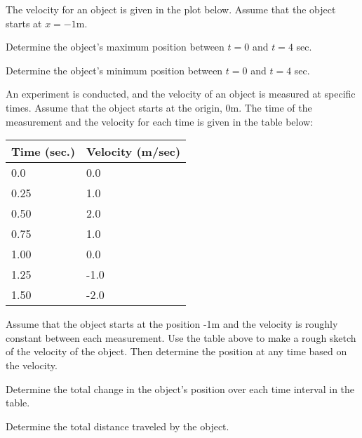 
\begin{problem}
\item The velocity for an object is given in the plot below. Assume
  that the object starts at $x=-1$m.

    \scalebox{0.7}{}

    \begin{subproblem}
    \item Determine the object's maximum position between $t=0$ and
      $t=4$ sec.
      \vfill
    \item Determine the object's minimum position between $t=0$ and
      $t=4$ sec.
      \vfill
    \end{subproblem}

\clearpage

\item An experiment is conducted, and the velocity of an object is
  measured at specific times. Assume that the object starts at the
  origin, 0m. The time of the measurement and the
  velocity for each time is given in the table below: \\
  \begin{tabular}{l|l}
    Time (sec.) & Velocity (m/sec) \\ \hline
    0.0  & 0.0 \\
    0.25 & 1.0 \\
    0.50 & 2.0 \\
    0.75 & 1.0 \\
    1.00 & 0.0 \\
    1.25 & -1.0 \\
    1.50 & -2.0
  \end{tabular}

  \begin{subproblem}
  \item Assume that the object starts at the position -1m and the
    velocity is roughly constant between each measurement. Use the
    table above to make a rough sketch of the velocity of the
    object. Then determine the position at any time based on the
    velocity.  

    \scalebox{0.7}{}

  \item Determine the total change in the object's position over each
    time interval in the table.

    \vfill

  \item Determine the total distance traveled by the object.

    \vfill

  \end{subproblem}



\end{problem}


